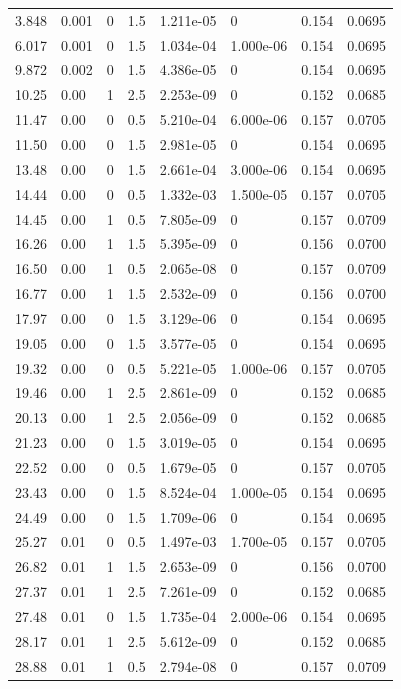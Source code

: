 \documentclass[preview]{standalone}
\begin{document}
{{\begin{tabular}{L{1.2cm}C{1.2cm} C{0.3cm}C{0.5cm} C{1.4cm}C{1.4cm} C{1.4cm}C{1.4cm}}
  3.848  &  0.001  & 0     & 1.5 &  1.211e-05  & 0  & 0.154 &  0.0695   \\ 
  6.017  &  0.001  & 0     & 1.5 &  1.034e-04  & 1.000e-06  & 0.154 &  0.0695   \\ 
  9.872  &  0.002  & 0     & 1.5 &  4.386e-05  & 0  & 0.154 &  0.0695   \\ 
  10.25  &  0.00  & 1     & 2.5 &  2.253e-09  & 0  & 0.152 &  0.0685   \\ 
  11.47  &  0.00  & 0     & 0.5 &  5.210e-04  & 6.000e-06  & 0.157 &  0.0705   \\ 
  11.50  &  0.00  & 0     & 1.5 &  2.981e-05  & 0  & 0.154 &  0.0695   \\ 
  13.48  &  0.00  & 0     & 1.5 &  2.661e-04  & 3.000e-06  & 0.154 &  0.0695   \\ 
  14.44  &  0.00  & 0     & 0.5 &  1.332e-03  & 1.500e-05  & 0.157 &  0.0705   \\ 
  14.45  &  0.00  & 1     & 0.5 &  7.805e-09  & 0  & 0.157 &  0.0709   \\ 
  16.26  &  0.00  & 1     & 1.5 &  5.395e-09  & 0  & 0.156 &  0.0700   \\ 
  16.50  &  0.00  & 1     & 0.5 &  2.065e-08  & 0  & 0.157 &  0.0709   \\ 
  16.77  &  0.00  & 1     & 1.5 &  2.532e-09  & 0  & 0.156 &  0.0700   \\ 
  17.97  &  0.00  & 0     & 1.5 &  3.129e-06  & 0  & 0.154 &  0.0695   \\ 
  19.05  &  0.00  & 0     & 1.5 &  3.577e-05  & 0  & 0.154 &  0.0695   \\ 
  19.32  &  0.00  & 0     & 0.5 &  5.221e-05  & 1.000e-06  & 0.157 &  0.0705   \\ 
  19.46  &  0.00  & 1     & 2.5 &  2.861e-09  & 0  & 0.152 &  0.0685   \\ 
  20.13  &  0.00  & 1     & 2.5 &  2.056e-09  & 0  & 0.152 &  0.0685   \\ 
  21.23  &  0.00  & 0     & 1.5 &  3.019e-05  & 0  & 0.154 &  0.0695   \\ 
  22.52  &  0.00  & 0     & 0.5 &  1.679e-05  & 0  & 0.157 &  0.0705   \\ 
  23.43  &  0.00  & 0     & 1.5 &  8.524e-04  & 1.000e-05  & 0.154 &  0.0695   \\ 
  24.49  &  0.00  & 0     & 1.5 &  1.709e-06  & 0  & 0.154 &  0.0695   \\ 
  25.27  &  0.01  & 0     & 0.5 &  1.497e-03  & 1.700e-05  & 0.157 &  0.0705   \\ 
  26.82  &  0.01  & 1     & 1.5 &  2.653e-09  & 0  & 0.156 &  0.0700   \\ 
  27.37  &  0.01  & 1     & 2.5 &  7.261e-09  & 0  & 0.152 &  0.0685   \\ 
  27.48  &  0.01  & 0     & 1.5 &  1.735e-04  & 2.000e-06  & 0.154 &  0.0695   \\ 
  28.17  &  0.01  & 1     & 2.5 &  5.612e-09  & 0  & 0.152 &  0.0685   \\ 
  28.88  &  0.01  & 1     & 0.5 &  2.794e-08  & 0  & 0.157 &  0.0709   \\ 
\hline 
\end{tabular} 

}}
\end{document}

